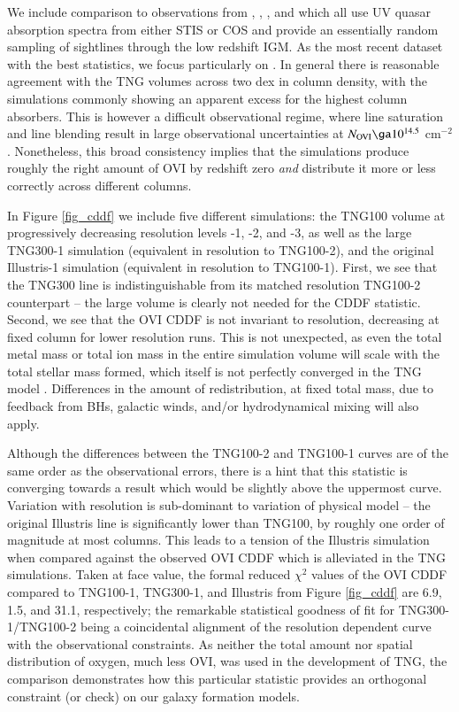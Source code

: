 \documentclass[useAMS,usenatbib]{mnras}
\newcommand{\ovi}{OVI\xspace}
\begin{document}
We include comparison to observations from \cite{danforth08}, \cite{thom08}, \cite{tripp08}, and \cite{danforth16} which all use UV quasar absorption spectra from either STIS or COS and provide an essentially random sampling of sightlines through the low redshift IGM. As the most recent dataset with the best statistics, we focus particularly on \cite{danforth16}. In general there is reasonable agreement with the TNG volumes across two dex in column density, with the simulations commonly showing an apparent excess for the highest column absorbers. This is however a difficult observational regime, where line saturation and line blending result in large observational uncertainties at $N_{\rm OVI} \ga 10^{14.5}$ cm$^{-2}$ \citep[see discussion in][]{rahmati16}. Nonetheless, this broad consistency implies that the simulations produce roughly the right amount of \ovi by redshift zero \textit{and} distribute it more or less correctly across different columns.

In Figure \ref{fig_cddf} we include five different simulations: the TNG100 volume at progressively decreasing resolution levels -1, -2, and -3, as well as the large TNG300-1 simulation (equivalent in resolution to TNG100-2), and the original Illustris-1 simulation (equivalent in resolution to TNG100-1). First, we see that the TNG300 line is indistinguishable from its matched resolution TNG100-2 counterpart -- the large volume is clearly not needed for the CDDF statistic. Second, we see that the \ovi CDDF is not invariant to resolution, decreasing at fixed column for lower resolution runs. This is not unexpected, as even the total metal mass or total ion mass in the entire simulation volume will scale with the total stellar mass formed, which itself is not perfectly converged in the TNG model \citep[see discussions in][]{pillepich17a,pillepich18}. Differences in the amount of redistribution, at fixed total mass, due to feedback from BHs, galactic winds, and/or hydrodynamical mixing will also apply.

Although the differences between the TNG100-2 and TNG100-1 curves are of the same order as the observational errors, there is a hint that this statistic is converging towards a result which would be slightly above the uppermost curve. Variation with resolution is sub-dominant to variation of physical model -- the original Illustris line is significantly lower than TNG100, by roughly one order of magnitude at most columns. This leads to a tension of the Illustris simulation when compared against the observed \ovi CDDF \citep[explored in][]{suresh15} which is alleviated in the TNG simulations. Taken at face value, the formal reduced $\chi^2$ values of the \cite{danforth16} \ovi CDDF compared to TNG100-1, TNG300-1, and Illustris from Figure \ref{fig_cddf} are 6.9, 1.5, and 31.1, respectively; the remarkable statistical goodness of fit for TNG300-1/TNG100-2 being a coincidental alignment of the resolution dependent curve with the observational constraints. As neither the total amount nor spatial distribution of oxygen, much less \ovi, was used in the development of TNG, the comparison demonstrates how this particular statistic provides an orthogonal constraint (or check) on our galaxy formation models.
\end{document}
